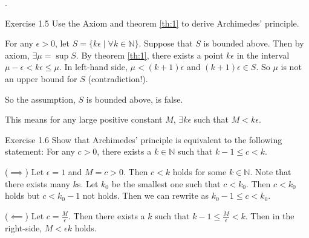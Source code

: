 \documentclass[8pt]{beamer}
\newcommand{\mbb}[1]{\mathbb{#1}}
\begin{document}
\begin{frame}{.}
    \begin{block}{Exercise 1.5}
        Use the Axiom and theorem \ref{th:1} to derive Archimedes' principle.

        For any $\epsilon > 0$, let $S = \{k\epsilon \mid \forall k \in \mbb{N}\}$.
        Suppose that $S$ is bounded above.
        Then by axiom, $\exists \mu = \sup S$.
        By theorem \ref{th:1}, there exists a point $k\epsilon$ in the interval $\mu - \epsilon < k \epsilon \leq \mu$.
        In left-hand side, $\mu < (k+1)\epsilon$ and $(k+1) \epsilon \in S$.
        So $\mu$ is not an upper bound for $S$ (contradiction!).

        So the assumption, $S$ is bounded above, is false.

        This means for any large positive constant $M$, $\exists k\epsilon$ such that $M < k \epsilon$.
    \end{block}

    \begin{block}{Exercise 1.6}
        Show that Archimedes' principle is equivalent to the following statement: For any $c > 0$, there exists a $k \in \mbb{N}$ such that $k-1 \leq c <k$.

        ($\implies$) Let $\epsilon = 1$ and $M = c > 0$.
        Then $c < k$ holds for some $k \in \mbb{N}$.
        Note that there exists many $k$s.
        Let $k_0$ be the smallest one such that $c < k_0$.
        Then $c < k_0$ holds but $c <k_0 -1$ not holds.
        Then we can rewrite as $k_0 -1 \leq c <k_0$.

        ($\impliedby$) Let $c = \frac{M}{\epsilon}$.
        Then there exists a $k$ such that $k-1 \leq \frac{M}{\epsilon} < k$.
        Then in the right-side, $M < \epsilon k$ holds.
    \end{block}
\end{frame}
\end{document}
